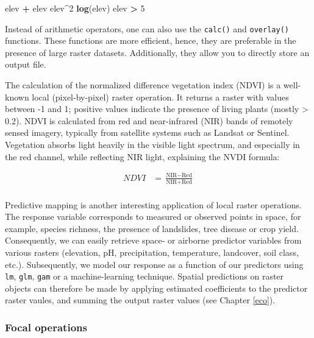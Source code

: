 \documentclass[]{krantz}
\newenvironment{Shaded}{\begin{snugshade}}{\end{snugshade}}
\newcommand{\DecValTok}[1]{\textcolor[rgb]{0.06,0.06,0.06}{#1}}
\newcommand{\KeywordTok}[1]{\textcolor[rgb]{0.27,0.27,0.27}{\textbf{#1}}}
\newcommand{\NormalTok}[1]{#1}
\newcommand{\OperatorTok}[1]{\textcolor[rgb]{0.43,0.43,0.43}{\textbf{#1}}}
\newcommand{\StringTok}[1]{\textcolor[rgb]{0.5,0.5,0.5}{#1}}
\begin{document}
\begin{Shaded}
\begin{Highlighting}[]
\NormalTok{elev }\OperatorTok{+}\StringTok{ }\NormalTok{elev}
\NormalTok{elev}\OperatorTok{^}\DecValTok{2}
\KeywordTok{log}\NormalTok{(elev)}
\NormalTok{elev }\OperatorTok{>}\StringTok{ }\DecValTok{5}
\end{Highlighting}
\end{Shaded}

Instead of arithmetic operators, one can also use the \texttt{calc()} and \texttt{overlay()} functions.
These functions are more efficient, hence, they are preferable in the presence of large raster datasets.
Additionally, they allow you to directly store an output file.

The calculation of the normalized difference vegetation index (NDVI) is a well-known local (pixel-by-pixel) raster operation.
It returns a raster with values between -1 and 1; positive values indicate the presence of living plants (mostly \textgreater{} 0.2).
NDVI is calculated from red and near-infrared (NIR) bands of remotely sensed imagery, typically from satellite systems such as Landsat or Sentinel.
Vegetation absorbs light heavily in the visible light spectrum, and especially in the red channel, while reflecting NIR light, explaining the NVDI formula:

\[
\begin{split}
NDVI&= \frac{\text{NIR} - \text{Red}}{\text{NIR} + \text{Red}}\\
\end{split}
\]

Predictive mapping is another interesting application of local raster operations.
The response variable corresponds to measured or observed points in space, for example, species richness, the presence of landslides, tree disease or crop yield.
Consequently, we can easily retrieve space- or airborne predictor variables from various rasters (elevation, pH, precipitation, temperature, landcover, soil class, etc.).
Subsequently, we model our response as a function of our predictors using \texttt{lm}, \texttt{glm}, \texttt{gam} or a machine-learning technique.
Spatial predictions on raster objects can therefore be made by applying estimated coefficients to the predictor raster vaules, and summing the output raster values (see Chapter \ref{eco}).

\hypertarget{focal-operations}{%
\subsubsection{Focal operations}\label{focal-operations}}
\end{document}
